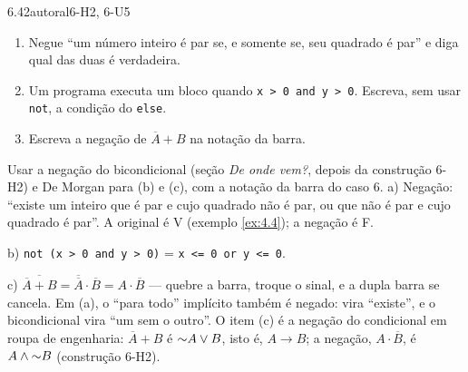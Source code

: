 \begin{exemplo}{6.4}{2}{autoral}{6-H2, 6-U5}\label{ex:6.4}
\begin{enumerate}[label=\alph*)]
  \item Negue \enquote{um número inteiro é par se, e somente se, seu quadrado é par} e diga qual das duas é verdadeira.
  \item Um programa executa um bloco quando \texttt{x > 0 and y > 0}. Escreva, sem usar \texttt{not}, a condição do \texttt{else}.
  \item Escreva a negação de $\overline{A}+B$ na notação da barra.
\end{enumerate}
\plano Usar a negação do bicondicional (seção \emph{De onde vem?}, depois da construção 6-H2) e De Morgan para (b) e (c), com a notação da barra do caso 6.
\resolucao
a) Negação: \enquote{existe um inteiro que é par e cujo quadrado não é par, ou que não é par e cujo quadrado é par}. A original é V (exemplo \ref{ex:4.4}); a negação é F.
\par b) \texttt{not (x > 0 and y > 0)} = \texttt{x <= 0 or y <= 0}.
\par c) $\overline{\overline{A}+B}=\overline{\overline{A}}\cdot\overline{B}=A\cdot\overline{B}$ — quebre a barra, troque o sinal, e a dupla barra se cancela.
\comentario Em (a), o \enquote{para todo} implícito também é negado: vira \enquote{existe}, e o bicondicional vira \enquote{um sem o outro}. O item (c) é a negação do condicional em roupa de engenharia: $\overline{A}+B$ é ${{\sim}}A\vee B$, isto é, $A\rightarrow B$; a negação, $A\cdot\overline{B}$, é $A\wedge{{\sim}}B$ (construção 6-H2).
\end{exemplo}

